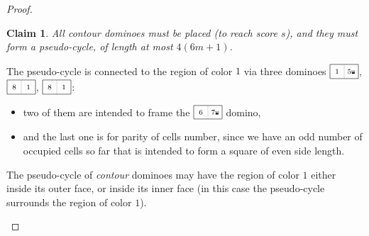 \documentclass[11pt,a4paper]{article}
\newtheorem{claim}{\textbf{Claim}}
\newcommand{\1}{\mathbb{1}}
\newcommand{\0}{\mathbb{0}}
\newcommand{\hdomino}[2]{\raisebox{-4pt}{\tikz[scale=.5]{\draw[black!25] (1,0) -- ++ (0,1); \draw (0,0) rectangle ++ (2,1); \node at (.5,.5) {\scriptsize $#1$}; \node at (1.5,.5) {\scriptsize $#2$};}}}
\newcommand{\crown}{\tikz[scale=.05]{
  \fill (0,0) -- (0,2) -- (.5,.5) -- (1,2) -- (1.5,.5) -- (2,2) -- (2,0) -- cycle;
  \draw (0,2) circle (5pt);
  \draw (1,2) circle (5pt);
  \draw (2,2) circle (5pt);
}}
\begin{document}
\begin{proof}
\begin{enumerate}[topsep=.5em,itemsep=.5em]
      \begin{claim}
        \label{claim:contour}
        All {\em contour} dominoes must
        be placed (to reach score $s$), and they must form a pseudo-cycle,
        of length at most $4(6m+1)$.
      \end{claim}
      The pseudo-cycle is connected to the region of color $1$ via three dominoes
      $\hdomino{1}{5{\crown}}$, $\hdomino{8}{1}$, $\hdomino{8}{1}$:
      \begin{itemize}
        \item two of them
          are intended to frame the $\hdomino{6}{7{\crown}}$ domino,
        \item and the last
          one is for parity of cells number, since we have an odd number of
          occupied cells so far that is intended to form a square
          of even side length.
      \end{itemize}
      The pseudo-cycle of {\em contour} dominoes may have the region of
      color $1$ either inside its outer face,
      or inside its inner face (in this case
      the pseudo-cycle surrounds the region of color $1$).


\end{enumerate}
\end{proof}
\end{document}
